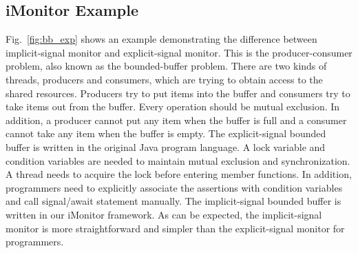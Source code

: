 \documentclass[preprint]{sigplanconf}
\begin{document}
\subsection{iMonitor Example}

Fig.~\ref{fig:bb_exp} shows an example demonstrating the difference between 
implicit-signal monitor and explicit-signal monitor. This is the 
producer-consumer problem, also known as the bounded-buffer problem. 
There are two kinds of threads, producers and consumers, which are 
trying to obtain access to the shared resources. Producers try to put items 
into the buffer and consumers try to take items out from the buffer. Every 
operation should be mutual exclusion. In addition, a producer cannot put any 
item when the buffer is full and a consumer cannot take any item when the 
buffer is empty. The explicit-signal bounded buffer is written in the original 
Java program language. A lock variable and condition variables are
needed to maintain mutual exclusion and synchronization. A thread needs to
acquire the lock before entering member functions. In addition, programmers need
to explicitly associate the assertions with condition variables and call
signal/await statement manually. The implicit-signal bounded buffer is written
in our iMonitor framework. As can be expected, the implicit-signal monitor is
more straightforward and simpler than the explicit-signal monitor for
programmers. 
\end{document}
